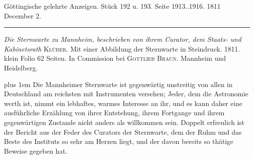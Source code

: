 \clearpage
{}
\hypertarget{native-541-lower}{}\label{native-541-lower}
\begin{center}\small Göttingische gelehrte Anzeigen. Stück 192 u. 193. Seite 1913..1916. 1811 December 2.\\[3pt]\rule{.72\linewidth}{.3pt}\end{center}

\emph{Die Sternwarte zu Mannheim, beschrieben von ihrem Curator, dem Staats- und Kabinetsrath} \textsc{Klüber}. Mit einer Abbildung der Sternwarte in Steindruck. 1811. klein Folio 62 Seiten. In Commission bei \textsc{Gottlieb Braun}. Mannheim und Heidelberg.

{\rightskip=0pt plus 1em
Die Mannheimer Sternwarte ist gegenwärtig unstreitig von allen in Deutschland am reichsten mit Instrumenten versehen; Jeder, dem die Astronomie werth ist, nimmt ein lebhaftes, warmes Interesse an ihr, und es kann daher eine ausführliche Erzählung von ihrer Entstehung, ihrem Fortgange und ihrem gegenwärtigen Zustande nicht anders als willkommen sein. Doppelt erfreulich ist der Bericht aus der Feder des Curators der Sternwarte, dem der Ruhm und das Beste des Instituts so sehr am Herzen liegt, und der davon bereits so thätige Beweise gegeben hat.\par}

